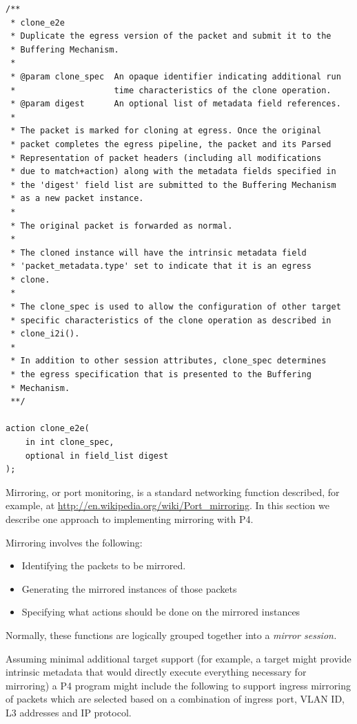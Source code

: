 \documentclass[12pt]{article}
\begin{document}
\begin{lstlisting}[style=P4style]
/**
 * clone_e2e
 * Duplicate the egress version of the packet and submit it to the 
 * Buffering Mechanism.
 *
 * @param clone_spec  An opaque identifier indicating additional run
 *                    time characteristics of the clone operation.
 * @param digest      An optional list of metadata field references.
 *
 * The packet is marked for cloning at egress. Once the original
 * packet completes the egress pipeline, the packet and its Parsed
 * Representation of packet headers (including all modifications
 * due to match+action) along with the metadata fields specified in
 * the 'digest' field list are submitted to the Buffering Mechanism
 * as a new packet instance. 
 * 
 * The original packet is forwarded as normal.
 * 
 * The cloned instance will have the intrinsic metadata field
 * 'packet_metadata.type' set to indicate that it is an egress
 * clone. 
 * 
 * The clone_spec is used to allow the configuration of other target
 * specific characteristics of the clone operation as described in 
 * clone_i2i(). 
 * 
 * In addition to other session attributes, clone_spec determines
 * the egress specification that is presented to the Buffering
 * Mechanism.
 **/

action clone_e2e(
    in int clone_spec,
    optional in field_list digest
);

\end{lstlisting}


Mirroring, or port monitoring, is a standard networking function described, 
for example, at \url{http://en.wikipedia.org/wiki/Port_mirroring}.
In this section 
we describe one approach to implementing mirroring with P4.

Mirroring involves the following:

\begin{itemize}
\item
Identifying the packets to be mirrored.
\item
Generating the mirrored instances of those packets
\item
Specifying what actions should be done on the mirrored instances
\end{itemize}


Normally, these functions are logically grouped together into a \textit{mirror session.}

Assuming minimal additional target support (for example, a target might provide 
intrinsic metadata that would directly execute everything necessary for mirroring) 
a P4 program might include the following to support ingress mirroring of packets 
which are selected based on a combination of ingress port, VLAN ID, L3 addresses 
and IP protocol.
\end{document}
